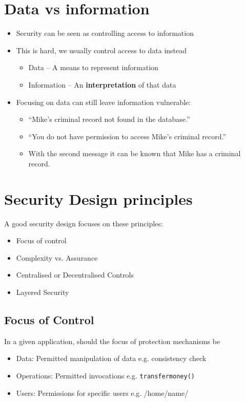\documentclass{article}
\begin{document}
\section{Data vs information}
\begin{itemize}
  \item Security can be seen as controlling access to information 
  \item This is hard, we usually control access to data instead  
  \begin{itemize}
    \item Data – A means to represent information 
    \item Information – An \textbf{interpretation} of that data 
  \end{itemize}  
  \item Focusing on data can still leave information vulnerable:
  \begin{itemize}
    \item “Mike’s criminal record not found in the database.”
    \item “You do not have permission to access Mike’s criminal record.”
    \item With the second message it can be known that Mike has a criminal record.
  \end{itemize}
\end{itemize}

\section{Security Design principles}

\begin{flushleft}
A good security design focuses on these principles:
\end{flushleft}
\begin{itemize}
  \item Focus of control
  \item Complexity vs. Assurance
  \item Centralised or Decentralised Controls
  \item Layered Security
\end{itemize}

\subsection{Focus of Control}
\begin{flushleft}
In a given application, should the focus of protection mechanisms be
\begin{itemize}
  \item Data: Permitted manipulation of data e.g. consistency check
  \item Operations: Permitted invocations e.g. \verb!transfermoney()!
  \item Users: Permissions for specific users e.g. /home/name/
\end{itemize}
\end{flushleft}
\end{document}
